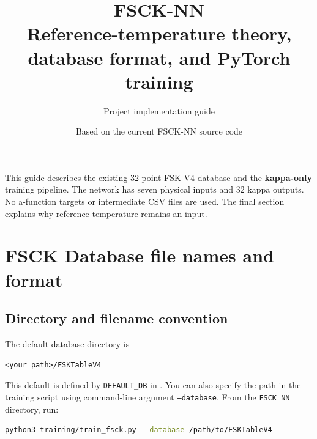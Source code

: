 \documentclass[11pt,letterpaper]{article}
\title{\textbf{FSCK-NN}\\[0.4em]\large Reference-temperature theory, database format, and PyTorch training}
\author{Project implementation guide}
\date{\small Based on the current FSCK-NN source code}
\begin{document}
\maketitle
\vspace{-1em}
This guide describes the existing 32-point FSK V4 database and the
\textbf{kappa-only} training pipeline. The network has seven physical inputs
and 32 kappa outputs. No a-function targets or intermediate CSV files are used.
The final section explains why reference temperature remains an input.

\section{FSCK Database file names and format}
\subsection{Directory and filename convention}
The default database directory is
\begin{lstlisting}
<your path>/FSKTableV4
\end{lstlisting}
This default is defined by \texttt{DEFAULT\_DB} in
. You can also specify the path in the training script  using command-line argument \texttt{--database}. From the \texttt{FSCK\_NN} directory, run:
\begin{lstlisting}[language=bash]
python3 training/train_fsck.py --database /path/to/FSKTableV4
\end{lstlisting}
\end{document}
